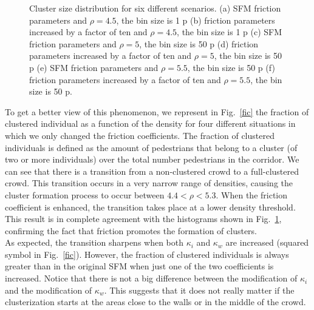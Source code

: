 \begin{figure}[!htbp]
\caption[width=0.47\columnwidth]{Cluster size distribution for six different scenarios. (a) SFM friction parameters and $\rho=4.5$, the bin size is 1 p (b) friction parameters increased by a factor of ten and $\rho=4.5$, the bin size is 1 p (c) SFM friction parameters and $\rho=5$, the bin size is 50 p (d) friction parameters increased by a factor of ten and $\rho=5$, the bin size is 50 p (e) SFM friction parameters and $\rho=5.5$, the bin size is 50 p (f) friction parameters increased by a factor of ten and $\rho=5.5$, the bin size is 50 p.}
\label{cluster_distribution}
\end{figure}

To get a better view of this phenomenon, we represent in Fig.~\ref{fic} the fraction of clustered individual as a function of the density for four different situations in which we only changed the friction coefficients. The fraction of clustered individuals is defined as the amount of pedestrians that belong to a cluster (of two or more individuals) over the total number pedestrians in the corridor. 
We can see that there is a transition from a non-clustered crowd to a full-clustered crowd. This transition occurs in a very narrow range of densities, causing the cluster formation process to occur between $4.4<\rho<5.3$. When the friction coefficient is enhanced, the transition takes place at a lower density threshold. This result is in complete agreement with the histograms shown in Fig.~\ref{cluster_distribution}, confirming the fact that friction promotes the formation of clusters.\\

As expected, the transition sharpens when both $\kappa_i$ and $\kappa_w$ are increased (squared symbol in Fig.~\ref{fic}). However, the fraction of clustered individuals is always greater than in the original SFM when just one of the
two coefficients is increased. Notice that there is not a big difference between the modification of $\kappa_i$ and the modification of $\kappa_w$. This suggests that it does not really matter if the clusterization starts at the areas close to the walls or in the middle of the crowd.\\


